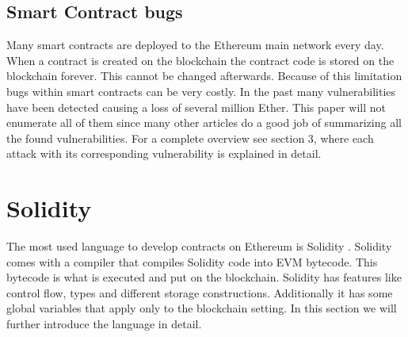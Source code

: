 \documentclass[a4paper]{article}
\begin{document}
\subsection{Smart Contract bugs}
Many smart contracts are deployed to the Ethereum main network every day. When a contract is created on the blockchain the contract code is stored on the blockchain forever. This cannot be changed afterwards. Because of this limitation bugs within smart contracts can be very costly. In the past many vulnerabilities have been detected causing a loss of several million Ether. This paper will not enumerate all of them since many other articles do a good job of summarizing all the found vulnerabilities. For a complete overview see \cite{dika2017ethereum} section 3, where each attack with its corresponding vulnerability is explained in detail.

\section{Solidity}
\label{sec:solidity}
The most used language to develop contracts on Ethereum is Solidity \cite{solidityreadthedocs}. Solidity comes with a compiler that compiles Solidity code into EVM bytecode. This bytecode is what is executed and put on the blockchain. Solidity has features like control flow, types and different storage constructions. Additionally it has some global variables that apply only to the blockchain setting. In this section we will further introduce the language in detail.
\end{document}

